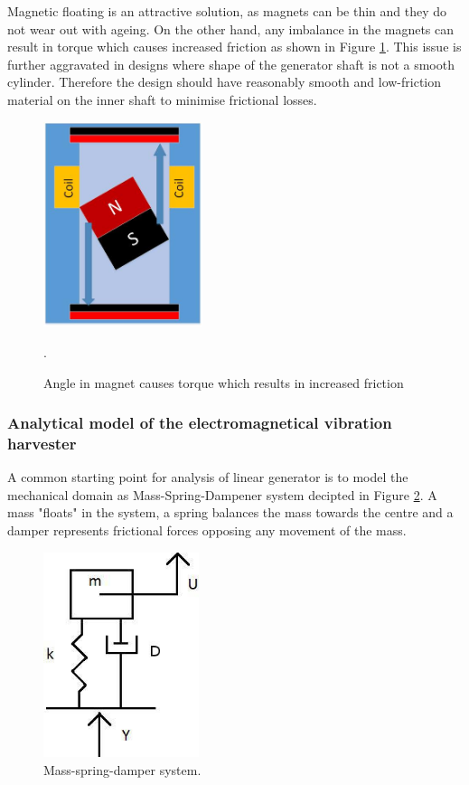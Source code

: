 Magnetic floating is an attractive solution, as magnets can be thin and they do not wear out with ageing. On the other hand, any imbalance in the magnets can result in torque which causes increased friction as shown in Figure \ref{fig:lg_torgue}. This issue is further aggravated in designs where shape of the generator shaft is not a smooth cylinder. Therefore the design should have reasonably smooth and low-friction material on the inner shaft to minimise frictional losses.

\begin{figure}[htb]
\begin{center}
\includegraphics[height=6cm]{images/own_dwg/generator_torgue}
\end{center}
\caption{Angle in magnet causes torque which results in increased friction}.
\label{fig:lg_torgue}
\end{figure}



\subsubsection{Analytical model of the electromagnetical vibration harvester}
A common starting point for analysis of linear generator is to model the mechanical domain as Mass-Spring-Dampener system decipted in Figure \ref{MSD}. A mass "floats" in the system, a spring balances the mass towards the centre and a damper represents frictional forces opposing any movement of the mass. 

\begin{figure}[htb]
\begin{center}
\includegraphics[height=6cm]{images/own_dwg/MSD.jpg}
\end{center}
\caption{\label{MSD} Mass-spring-damper system.}
\end{figure}

